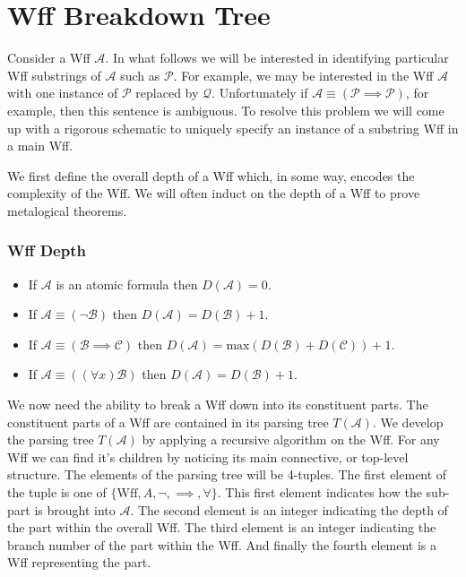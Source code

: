 \documentclass[12pt]{article}
\theoremstyle{break}
\theoremstyle{break}
\theoremstyle{break}
\theoremstyle{break}
\theoremstyle{break}
\newtheorem{informal definition}[definition]{Informal Definition}
\newcommand{\mc}[1]{\mathcal{#1}}
\begin{document}
\section{Wff Breakdown Tree}

Consider a Wff $\mc{A}$.
In what follows we will be interested in identifying particular Wff substrings of $\mc{A}$ such as $\mc{P}$.
For example, we may be interested in the Wff $\mc{A}$ with one instance of $\mc{P}$ replaced by $\mc{Q}$.
Unfortunately if $\mc{A} \equiv (\mc{P} \implies \mc{P})$, for example, then this sentence is ambiguous.
To resolve this problem we will come up with a rigorous schematic to uniquely specify an instance of a substring Wff in a main Wff.

We first define the overall depth of a Wff which, in some way, encodes the complexity of the Wff.
We will often induct on the depth of a Wff to prove metalogical theorems.

\hrulefill
\subsubsection*{Wff Depth}

\begin{itemize}
\item{If $\mc{A}$ is an atomic formula then $D(\mc{A}) = 0$.}
\item{If $\mc{A} \equiv (\lnot \mc{B})$ then $D(\mc{A}) = D(\mc{B}) + 1$.}
\item{If $\mc{A} \equiv (\mc{B} \implies \mc{C})$ then $D(\mc{A}) = \text{max}(D(\mc{B}) + D(\mc{C})) + 1$.}
\item{If $\mc{A} \equiv ((\forall x) \mc{B})$ then $D(\mc{A}) = D(\mc{B}) + 1$.}
\end{itemize}
\hrulefill

We now need the ability to break a Wff down into its constituent parts.
The constituent parts of a Wff are contained in its parsing tree $T(\mc{A})$.
We develop the parsing tree $T(\mc{A})$ by applying a recursive algorithm on the Wff.
For any Wff we can find it's children by noticing its main connective, or top-level structure.
The elements of the parsing tree will be 4-tuples.
The first element of the tuple is one of $\{\text{Wff}, A, \lnot, \implies, \forall\}$.
This first element indicates how the sub-part is brought into $\mc{A}$.
The second element is an integer indicating the depth of the part within the overall Wff.
The third element is an integer indicating the branch number of the part within the Wff.
And finally the fourth element is a Wff representing the part.
\end{document}
